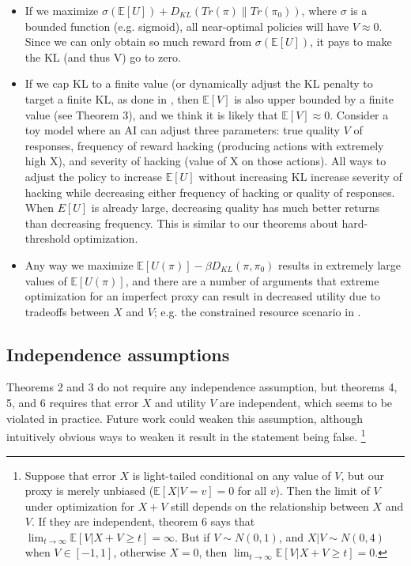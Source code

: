 \documentclass{article}
\begin{document}
\begin{itemize}
    \item If we maximize $\sigma(\mathbb E[U]) + D_{KL}(Tr(\pi) \| Tr(\pi_0))$, where $\sigma$ is a bounded function (e.g. sigmoid), all near-optimal policies will have $V \approx 0$. Since we can only obtain so much reward from $\sigma(\mathbb{E}[U])$, it pays to make the KL (and thus V) go to zero.
    \item If we cap KL to a finite value (or dynamically adjust the KL penalty to target a finite KL, as done in \citet{ziegler2020finetuning}, then $\mathbb E[V]$ is also upper bounded by a finite value (see Theorem 3), and we think it is likely that $\mathbb E[V] \approx 0$. Consider a toy model where an AI can adjust three parameters: true quality $V$ of responses, frequency of reward hacking (producing actions with extremely high X), and severity of hacking (value of X on those actions). All ways to adjust the policy to increase $\mathbb E[U]$ without increasing KL increase severity of hacking while decreasing either frequency of hacking or quality of responses. When $E[U]$ is already large, decreasing quality has much better returns than decreasing frequency. This is similar to our theorems about hard-threshold optimization.
    \item Any way we maximize $\mathbb{E} [U(\pi)]-\beta D_{K L}\left(\pi, \pi_0 \right)$ results in extremely large values of $\mathbb E[U(\pi)]$, and there are a number of arguments that extreme optimization for an imperfect proxy can result in decreased utility due to tradeoffs between $X$ and $V$; e.g. the constrained resource scenario in \citep{zhuang2021consequences}.
\end{itemize}

\subsection{Independence assumptions}

Theorems 2 and 3 do not require any independence assumption, but theorems 4, 5, and 6 requires that error $X$ and utility $V$ are independent, which seems to be violated in practice. Future work could weaken this assumption, although intuitively obvious ways to weaken it result in the statement being false. \footnote{Suppose that error $X$ is light-tailed conditional on any value of $V$, but our proxy is merely unbiased ($\mathbb E[X|V=v]=0$ for all $v$). Then the limit of $V$ under optimization for $X+V$ still depends on the relationship between $X$ and $V$. If they are independent, theorem 6 says that \(\lim_{t \to\infty} \mathbb E[V | X + V \ge t] = \infty\). But if \(V \sim N(0, 1)\), and \(X | V \sim N(0, 4)\) when \(V \in [-1, 1]\), otherwise \(X=0\), then \(\lim_{t \to\infty} \mathbb E[V | X + V \ge t] = 0\).} 
\end{document}
